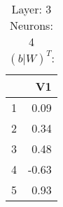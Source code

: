 \begin{table}[ht]
\centering
\begin{tabular}{rr}
  \hline
 & V1 \\ 
  \hline
1 & 0.09 \\ 
  2 & 0.34 \\ 
  3 & 0.48 \\ 
  4 & -0.63 \\ 
  5 & 0.93 \\ 
   \hline
\end{tabular}
\caption{Layer: 3 Neurons: 4  $(b|W)^T$: 
} 
\end{table}
